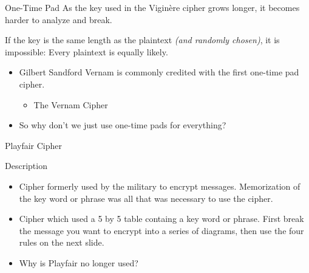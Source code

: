 \documentclass{beamer}
\begin{document}
\begin{frame}{One-Time Pad}
	As the key used in the Vigin\`ere cipher grows longer, it becomes harder to
	analyze and break.

	If the key is the same length as the plaintext {\it (and randomly chosen)},
	it is impossible: Every plaintext is equally likely.

	\begin{block}{}
		\begin{itemize}
			\item Gilbert Sandford Vernam is commonly credited with the first one-time pad cipher. 
			\begin{itemize}
				\item The Vernam Cipher
			\end{itemize}
		\end{itemize}
	\end{block}

	\begin{block}{}
		\begin{itemize}
			\item So why don't we just use one-time pads for everything?
		\end{itemize}
	\end{block}
\end{frame}

\begin{frame}{Playfair Cipher}
	\begin{block}{Description}
		\begin{itemize}
			\item Cipher formerly used by the military to encrypt messages. Memorization of the key word or phrase was all that was necessary to use the cipher.
			\item Cipher which used a 5 by 5 table containg a key word or phrase. First break the message you want to encrypt into a series of diagrams, then use the four rules on the next slide.
		\end{itemize}
	\end{block}

	\begin{block}{}
		\begin{itemize}
			\item Why is Playfair no longer used?
		\end{itemize}
	\end{block}
\end{frame}
\end{document}
